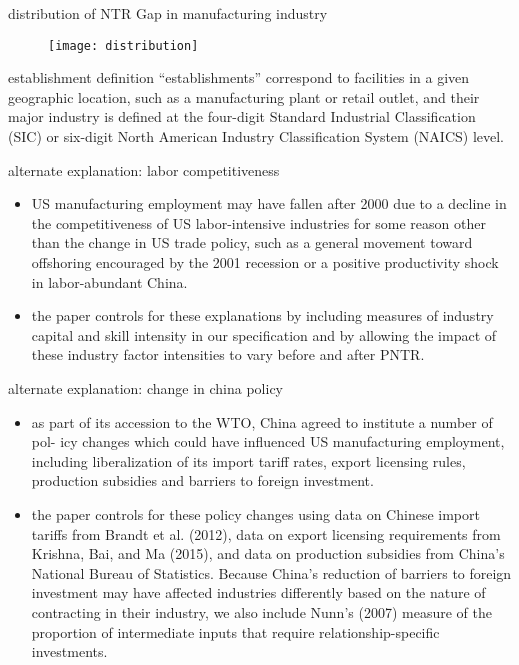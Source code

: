 \documentclass[10pt]{beamer}
\begin{document}
\begin{frame}{distribution of NTR Gap in manufacturing industry}
\label{distribution}

 	\begin{figure}
 		\texttt{[image: distribution]}	
 	\end{figure}

\end{frame}

\begin{frame}{establishment definition}
	\label{establishment}
	“establishments” correspond to facilities in a given geographic location, such as a manufacturing plant or retail outlet, and their major industry is defined at the four-digit Standard Industrial Classification (SIC) or six-digit North American Industry Classification System (NAICS) level. 
\end{frame}

\begin{frame}{alternate explanation: labor competitiveness}
	\label{labor}
	\begin{itemize}
		\item US manufacturing employment may have fallen after 2000 due to a decline in the competitiveness of US labor-intensive industries for some reason other than the change in US trade policy, such as a general movement toward offshoring encouraged by the 2001 recession or a positive productivity shock in labor-abundant China. 
		\item the paper controls for these explanations by including measures of industry capital and skill intensity in our specification and by allowing the impact of these industry factor intensities to vary before and after PNTR. 
	\end{itemize}
	
\end{frame}

\begin{frame}{alternate explanation: change in china policy}
	\label{china}
	
	\begin{itemize}
		\item as part of its accession to the WTO, China agreed to institute a number of pol- icy changes which could have influenced US manufacturing employment, including liberalization of its import tariff rates, export licensing rules, production subsidies and barriers to foreign investment. 
		\item the paper controls for these policy changes using data on Chinese import tariffs from Brandt et al. (2012), data on export licensing requirements from Krishna, Bai, and Ma (2015), and data on production subsidies from China’s National Bureau of Statistics. Because China’s reduction of barriers to foreign investment may have affected industries differently based on the nature of contracting in their industry, we also include Nunn’s (2007) measure of the proportion of intermediate inputs that require relationship-specific investments. 
	\end{itemize}
\end{frame}
\end{document}
